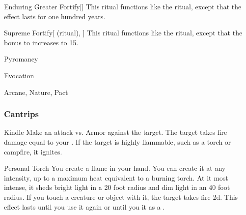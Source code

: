 \lowercase{\hypertarget{spell:Enduring Greater Fortify}{}}\label{spell:Enduring Greater Fortify}
\begin{apability}[\nth{5}]{\hypertarget{spell:Enduring Greater Fortify}{Enduring Greater Fortify}}[]
This ritual functions like the  ritual, except that the effect lasts for one hundred years.
\end{apability}
\vspace{0.25em}



\lowercase{\hypertarget{spell:Supreme Fortify}{}}\label{spell:Supreme Fortify}
\begin{attuneability}[\nth{6}]{\hypertarget{spell:Supreme Fortify}{Supreme Fortify}}[ (ritual), ]
This ritual functions like the  ritual, except that the bonus to  increases to 15.
\end{attuneability}
\vspace{0.25em}


\newpage
\begin{spellsection}{Pyromancy}

\begin{spellheader}
\end{spellheader}


 Evocation

 Arcane, Nature, Pact

\subsubsection{Cantrips}


\begin{freeability}{Kindle}
Make an attack vs. Armor against the target.
\hit The target takes fire damage equal to your .
If the target is highly flammable, such as a torch or campfire, it ignites.
\end{freeability}


\begin{freeability}{Personal Torch}
You create a flame in your hand.
You can create it at any intensity, up to a maximum heat equivalent to a burning torch.
At it most intense, it sheds bright light in a 20 foot radius and dim light in an 40 foot radius.
If you touch a creature or object with it, the target takes fire  \minus2d.
This effect lasts until you use it again or until you  it as a .
\end{freeability}

\end{spellsection}


